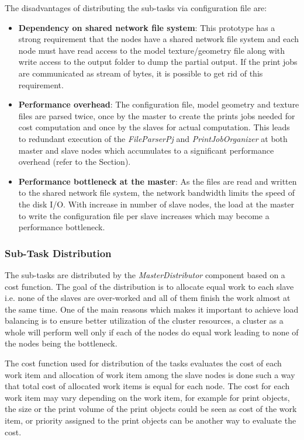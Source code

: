The disadvantages of distributing the sub-tasks via configuration file are: 
\begin{itemize}
\item \textbf{Dependency on shared network file system}: This prototype has a strong requirement that the nodes have a shared network file system and each node must have read access to the model texture/geometry file along with write access to the output folder to dump the partial output. If the print jobs are communicated as stream of bytes, it is possible to get rid of this requirement.
\item \textbf{Performance overhead}: The configuration file, model geometry and texture files are parsed twice, once by the master to create the prints jobs needed for cost computation and once by the slaves for actual computation. This leads to redundant execution of the \textit{FileParserPj} and \textit{PrintJobOrganizer} at both master and slave nodes which accumulates to a significant performance overhead (refer to the Section).
\item \textbf{Performance bottleneck at the master}: As the files are read and written to the shared network file system, the network bandwidth limits the speed of the disk I/O. With increase in number of slave nodes, the load at the master to write the configuration file per slave increases which may become a performance bottleneck. 
\end{itemize}

\subsubsection{Sub-Task Distribution}

The sub-tasks are distributed by the \textit{MasterDistributor} component based on a cost function. The goal of the distribution is to allocate equal work to each slave i.e. none of the slaves are over-worked and all of them finish the work almost at the same time. One of the main reasons which makes it important to achieve load balancing is to ensure better utilization of the cluster resources, a cluster as a whole will perform well only if each of the nodes do equal work leading to none of the nodes being the bottleneck. 

The cost function used for distribution of the tasks evaluates the cost of each work item and allocation of work item among the slave nodes is done such a way that total cost of allocated work items is equal for each node. The cost for each work item may vary depending on the work item, for example for print objects, the size or the print volume of the print objects could be seen as cost of the work item, or priority assigned to the print objects can be another way to evaluate the cost. 
\newline

